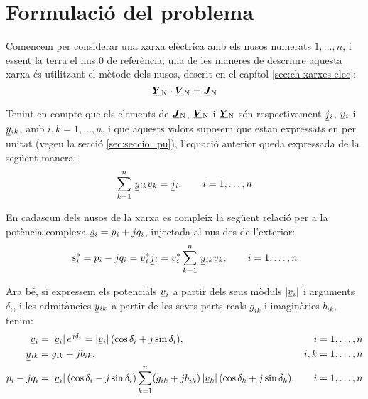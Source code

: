 \section{Formulació del problema}\label{sec:formul_prob} 

Comencem per considerar una xarxa elèctrica amb els nusos numerats
$1,\ldots,n$, i essent la terra el nus 0 de referència; una de les
maneres de descriure aquesta xarxa és utilitzant el mètode dels
nusos, descrit en el capítol \ref{sec:ch-xarxes-elec}:
\begin{equation}
    \mcmplx{Y}\ped{N} \cdot \mcmplx{V}\ped{N} = \mcmplx{J}\ped{N}
\end{equation}

Tenint en compte que els elements de $\mcmplx{J}\ped{N}$,
$\mcmplx{V}\ped{N}$ i $\mcmplx{Y}\ped{N}$ són respectivament $\cmplx{j}_i$,
$\cmplx{v}_i$ i  $\cmplx{y}_{ik}$, amb $i,k=1,\ldots,n$, 
i que aquests valors suposem que estan expressats en per unitat (vegeu la
secció \ref{sec:seccio_pu}), l'equació anterior queda expressada de
la següent manera:
\begin{equation}
    \sum^n_{k=1}\, \cmplx{y}_{ik} \cmplx{v}_k = \cmplx{j}_i, \qquad i=1,\ldots,n
\end{equation}

En cadascun dels nusos de la xarxa es compleix la següent relació
per a la potència complexa $\cmplx{s}_i = p_i + j q_i$, injectada
al nus des de l'exterior:
\begin{equation}
    \cmplx{s}_i^* = p_i - j q_i = \cmplx{v}_i^* \cmplx{j}_i = \cmplx{v}_i^*
    \sum^n_{k=1}\, \cmplx{y}_{ik} \cmplx{v}_k, \qquad i=1,\ldots,n \label{eq:sconj}
\end{equation}

Ara bé, si expressem els potencials $\cmplx{v}_i$ a partir dels seus mòduls $|\cmplx{v}_i|$
i arguments $\delta_i$, i les admitàncies $\cmplx{y}_{ik}$ a partir de les seves parts
reals $g_{ik}$ i imaginàries $b_{ik}$, tenim:
\begin{align}
    \cmplx{v}_i &=|\cmplx{v}_i|\, e^{j\delta_i} = |\cmplx{v}_i|\,
    (\cos\delta_i+j\sin\delta_i), & i & =1,\ldots,n\\
    \cmplx{y}_{ik} &= g_{ik} + j b_{ik}, & i,k & =1,\ldots,n \\
    p_i - j q_i &= |\cmplx{v}_i|\, (\cos\delta_i - j\sin\delta_i) \sum^n_{k=1} (g_{ik} + j
    b_{ik}) \,|\cmplx{v}_k| \,(\cos\delta_k + j\sin\delta_k), & i & =1,\ldots,n
\end{align}

